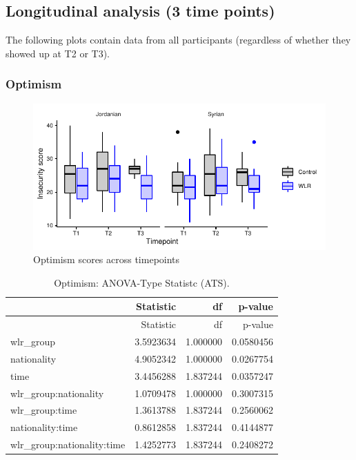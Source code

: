 \documentclass[]{article}
\begin{document}
\newpage

\hypertarget{longitudinal-analysis-3-time-points}{%
\subsection{Longitudinal analysis (3 time
points)}\label{longitudinal-analysis-3-time-points}}

The following plots contain data from all participants (regardless of
whether they showed up at T2 or T3).

\hypertarget{optimism}{%
\subsubsection{Optimism}\label{optimism}}

\begin{figure}[H]

{\centering \includegraphics{WLR-analyses-report_files/figure-latex/unnamed-chunk-19-1} 

}

\caption{Optimism scores across timepoints}\label{fig:unnamed-chunk-19}
\end{figure}

\begin{longtable}[]{@{}lrrr@{}}
\caption{Optimism: ANOVA-Type Statistc (ATS).}\tabularnewline
\toprule
& Statistic & df & p-value\tabularnewline
\midrule
\endfirsthead
\toprule
& Statistic & df & p-value\tabularnewline
\midrule
\endhead
wlr\_group & 3.5923634 & 1.000000 & 0.0580456\tabularnewline
nationality & 4.9052342 & 1.000000 & 0.0267754\tabularnewline
time & 3.4456288 & 1.837244 & 0.0357247\tabularnewline
wlr\_group:nationality & 1.0709478 & 1.000000 & 0.3007315\tabularnewline
wlr\_group:time & 1.3613788 & 1.837244 & 0.2560062\tabularnewline
nationality:time & 0.8612858 & 1.837244 & 0.4144877\tabularnewline
wlr\_group:nationality:time & 1.4252773 & 1.837244 &
0.2408272\tabularnewline
\bottomrule
\end{longtable}
\end{document}
